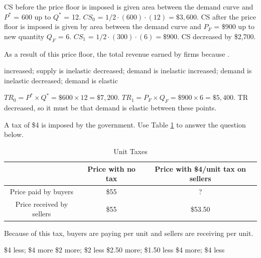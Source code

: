 \documentclass[addpoints,11pt]{exam}
\theoremstyle{definition}
\newcommand{\blank}[0]{\underline{\hspace{3cm}}}
\begin{document}
\begin{questions}
	\begin{solution}
		CS before the price floor is imposed is given area between the demand curve and $P^*$ = 600 up to $Q^*$ = 12. $CS_0$ = $1/2\cdot(600)\cdot(12) = \$3,600.$ CS after the price floor is imposed is given by area between the demand curve and $P_F$ = \$900 up to new quantity $Q_F$ = 6. $CS_1$ = $1/2 \cdot (300) \cdot (6) = \$900$. CS decreased by \$2,700.
	\end{solution}
	
	\question \label{blah2} As a result of this price floor, the total revenue earned by firms \blank because \blank.
	
	\begin{choices}
		\question increased; supply is inelastic 
		\question decreased; demand is inelastic
		\question increased; demand is inelastic
		\CorrectChoice decreased; demand is elastic
	\end{choices}
	
		
		\begin{solution}
			$TR_0 = P^* \times Q^* = \$600 \times 12 = \$7,200$. $TR_1 = P_F \times Q_F = \$900 \times 6 = \$5,400$. TR decreased, so it must be that demand is elastic between these points.
		\end{solution}
	
	
		\question A tax of \$4 is imposed by the government. Use Table \ref{MC27} to answer the question below.
		
		\begin{table}[H]
			\caption{Unit Taxes}
			\label{MC27}
			\centering
			\begin{tabular}{  c|c|c} 
				
				& Price with no tax & Price with \$4/unit tax on sellers \\
				\hline
				Price paid by buyers & \$55 & ? \\
				Price received by sellers & \$55 & \$53.50  \\
			\end{tabular}
		\end{table}
		
		Because of this tax, buyers are paying \underline{\hspace{3cm}} per unit and sellers are receiving \blank per unit.
		
		\begin{choices}
			\choice \$4 less; \$4 more
			\choice \$2 more; \$2 less
			\CorrectChoice \$2.50 more; \$1.50 less
			\choice \$4 more; \$4 less
		\end{choices}
		

\end{questions}
\end{document}
